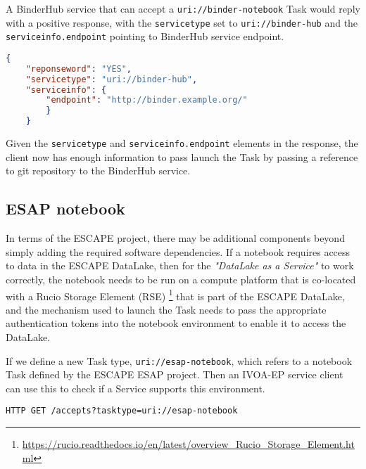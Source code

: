 \documentclass[11pt,a4paper]{ivoa}
\newcommand{\ivoep} {IVOA-EP\xspace}
\newcommand{\binderhub} {BinderHub\xspace}
\newcommand{\escape} {ESCAPE\xspace}
\newcommand{\datalake} {DataLake\xspace}
\newcommand{\codeword}[1] {\texttt{#1}}
\newcommand{\footurl}[1] {\footnote{\url{#1}}}
\begin{document}
A \binderhub service that can accept a \codeword{uri://binder-notebook} Task would reply with a positive response, with the \codeword{servicetype} set to \codeword{uri://binder-hub} and the \codeword{serviceinfo.endpoint} pointing to \binderhub service endpoint.
\begin{lstlisting}[language=json]
    {
    "reponseword": "YES",
    "servicetype": "uri://binder-hub",
    "serviceinfo": {
        "endpoint": "http://binder.example.org/"
        }
    }
\end{lstlisting}

Given the \codeword{servicetype} and \codeword{serviceinfo.endpoint} elements in the response, the client now has enough information to pass launch the Task by passing a reference to git repository to the \binderhub service.

\subsection{ESAP notebook}
\label{sec:uri://esap-notebook}
In terms of the \escape project, there may be additional components beyond simply adding the required software dependencies. If a notebook requires access to data in the \escape \datalake, then for the \textit{"DataLake as a Service"} to work correctly, the notebook needs to be run on a compute platform that is co-located with a Rucio Storage Element (RSE)
\footurl{https://rucio.readthedocs.io/en/latest/overview_Rucio_Storage_Element.html} that is part of the \escape \datalake, and the mechanism used to launch the Task needs to pass the appropriate authentication tokens into the notebook environment to enable it to access the \datalake.

If we define a new Task type, \codeword{uri://esap-notebook}, which refers to a notebook Task defined by the \escape ESAP project. Then an \ivoep service client can use this to check if a Service supports this environment.

\begin{lstlisting}[]
    HTTP GET /accepts?tasktype=uri://esap-notebook
\end{lstlisting}
\end{document}
